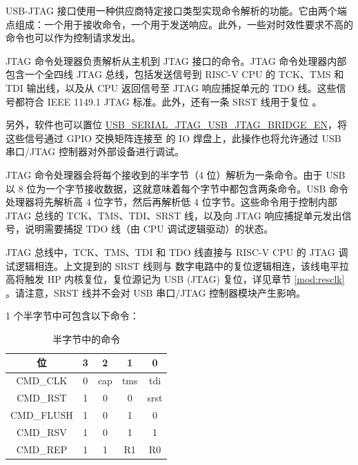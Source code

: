 \documentclass[main\_\_CN.tex]{subfiles}
\begin{document}
USB-JTAG 接口使用一种供应商特定接口类型实现命令解析的功能。它由两个端点组成：一个用于接收命令，一个用于发送响应。此外，一些对时效性要求不高的命令也可以作为控制请求发出。

JTAG 命令处理器负责解析从主机到 JTAG 接口的命令。JTAG 命令处理器内部包含一个全四线 JTAG 总线，包括发送信号到 RISC-V CPU 的 TCK、TMS 和 TDI 输出线，以及从 CPU 返回信号至 JTAG 响应捕捉单元的 TDO 线。这些信号都符合 IEEE 1149.1 JTAG 标准。此外，还有一条 SRST 线用于复位 \chipname{}。

另外，软件也可以置位 \hyperref[fielddesc:USBSERIALJTAGUSBJTAGBRIDGEEN]{USB\_SERIAL\_JTAG\_USB\_JTAG\_BRIDGE\_EN}，将这些信号通过 GPIO 交换矩阵连接至 \chipname{} 的 IO 焊盘上，此操作也将允许通过 USB 串口/JTAG 控制器对外部设备进行调试。

JTAG 命令处理器会将每个接收到的半字节（4 位）解析为一条命令。由于 USB 以 8 位为一个字节接收数据，这就意味着每个字节中都包含两条命令。USB 命令处理器将先解析高 4 位字节，然后再解析低 4 位字节。这些命令用于控制内部 JTAG 总线的 TCK、TMS、TDI、SRST 线，以及向 JTAG 响应捕捉单元发出信号，说明需要捕捉 TDO 线（由 CPU 调试逻辑驱动）的状态。

JTAG 总线中，TCK、TMS、TDI 和 TDO 线直接与 RISC-V CPU 的 JTAG 调试逻辑相连。上文提到的 SRST 线则与 \chipname{} 数字电路中的复位逻辑相连，该线电平拉高将触发 HP 内核复位，复位源记为 USB (JTAG) 复位，详见章节 \ref{mod:resclk} \textit{}。请注意，SRST 线并不会对 USB 串口/JTAG 控制器模块产生影响。

1 个半字节中可包含以下命令：

\begin{table}[H]
\centering
\caption{半字节中的命令}
\label{tab:usbserialjtag-commands-of-a-nibble}

\begin{tabular}{|c|c c c c|}\hline
\rowcolor{lightgray}
\textbf{位} & \textbf{3} & \textbf{2} & \textbf{1} & \textbf{0}\\\hline

CMD\_CLK & 0 &  cap & tms & tdi \\\hline
CMD\_RST & 1 & 0 & 0 & srst \\\hline
CMD\_FLUSH & 1 & 0 & 1 & 0 \\\hline
CMD\_RSV & 1 & 0 & 1 & 1 \\\hline
CMD\_REP & 1 & 1 & R1 & R0 \\\hline
\end{tabular}
\end{table}
\end{document}
